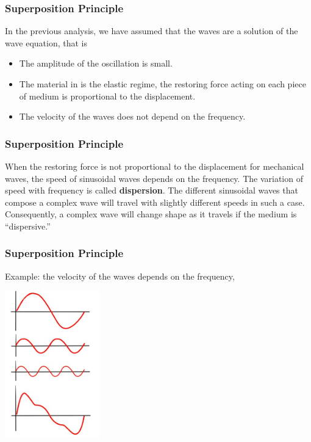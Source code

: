 \documentclass[]{beamer}
\begin{document}


\begin{frame}
\frametitle{Superposition Principle}

In the previous analysis, we have assumed that the waves are a solution of the wave equation, that is


\vspace{3mm}

\begin{itemize}
\item The amplitude of the oscillation is small.
\pause
\item The material in is the elastic regime, the restoring force acting on each piece of medium is proportional to the displacement. 
\pause
\item The velocity of the waves does not depend on the frequency. 
\end{itemize} 





  \end{frame}




\begin{frame}
\frametitle{Superposition Principle}


When the restoring force is not  proportional to the displacement for
mechanical waves, the speed of sinusoidal waves
depends on the frequency. The variation of speed with frequency is called \textbf{dispersion}.
The different sinusoidal waves that compose a complex wave will travel with slightly
different speeds in such a case. Consequently, a complex wave will change shape as it
travels if the medium is “dispersive.”


  \end{frame}




\begin{frame}
\frametitle{Superposition Principle}

Example: the velocity of the waves depends on the frequency,

  \begin{center}
  \includegraphics[height=2.5in]{images4/dispersion1.jpg}
\end{center}


  \end{frame}
\end{document}
